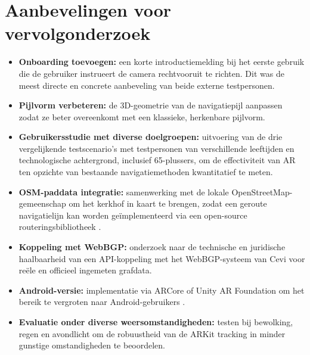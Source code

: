 \section{Aanbevelingen voor vervolgonderzoek}

\begin{itemize}
    \item \textbf{Onboarding toevoegen:} een korte introductiemelding bij het
    eerste gebruik die de gebruiker instrueert de camera rechtvooruit te richten.
    Dit was de meest directe en concrete aanbeveling van beide externe testpersonen.
    
    \item \textbf{Pijlvorm verbeteren:} de 3D-geometrie van de navigatiepijl
    aanpassen zodat ze beter overeenkomt met een klassieke, herkenbare pijlvorm.
    
    \item \textbf{Gebruikersstudie met diverse doelgroepen:} uitvoering van de
    drie vergelijkende testscenario's met testpersonen van verschillende leeftijden
    en technologische achtergrond, inclusief 65-plussers, om de effectiviteit van
    AR ten opzichte van bestaande navigatiemethoden kwantitatief te meten.
    
    \item \textbf{OSM-paddata integratie:} samenwerking met de lokale
    OpenStreetMap-gemeenschap om het kerkhof in kaart te brengen, zodat
    een geroute navigatielijn kan worden geïmplementeerd via een open-source
    routeringsbibliotheek \autocite{Novack2018}.
    
    \item \textbf{Koppeling met WebBGP:} onderzoek naar de technische en
    juridische haalbaarheid van een API-koppeling met het WebBGP-systeem
    van Cevi voor reële en officieel ingemeten grafdata.
    
    \item \textbf{Android-versie:} implementatie via ARCore of Unity AR
    Foundation om het bereik te vergroten naar Android-gebruikers
    \autocite{GoogleARCore2024}.
    
    \item \textbf{Evaluatie onder diverse weersomstandigheden:} testen bij
    bewolking, regen en avondlicht om de robuustheid van de ARKit tracking
    in minder gunstige omstandigheden te beoordelen.
\end{itemize}